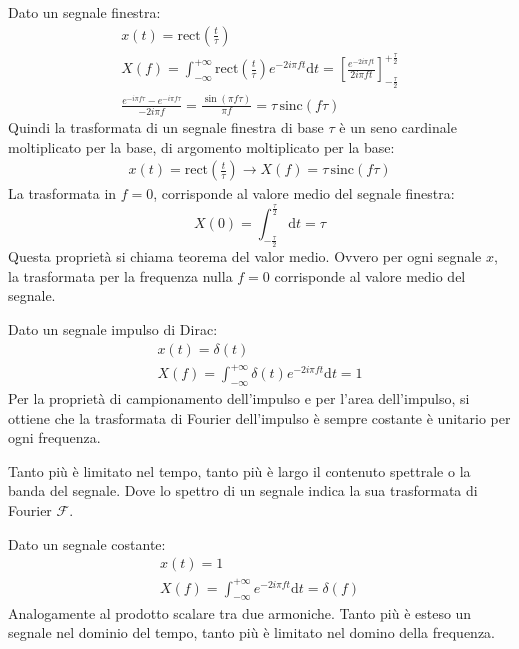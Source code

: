 \documentclass{article}
\newcommand{\rect}{\mathrm{rect}}
\newcommand{\sinc}{\mathrm{sinc}}
\newcommand{\df}{\mathrm{d}}
\numberwithin{equation}{subsection}
\begin{document}
Dato un segnale finestra:
\begin{gather*}
    x(t)=\rect\displaystyle\left(\frac{t}{\tau}\right)\\
    X(f)=\displaystyle\int_{-\infty}^{+\infty}\rect\left(\frac{t}{\tau}\right)e^{-2i\pi ft}\df t=\left[\frac{e^{-2i\pi ft}}{2i\pi ft}\right]^{+\frac{\tau}{2}}_{-\frac{\tau}{2}}\\
    \displaystyle\frac{e^{-i\pi f\tau}-e^{-i\pi f\tau}}{-2i\pi f}=\frac{\sin(\pi f\tau)}{\pi f}=\tau\,\sinc(f\tau)
\end{gather*}
Quindi la trasformata di un segnale finestra di base $\tau$ è un seno cardinale moltiplicato per la base, di argomento moltiplicato per la base:
\begin{gather*}
    x(t)=\rect\displaystyle\left(\frac{t}{\tau}\right)\rightarrow X(f)=\tau\,\sinc(f\tau)
\end{gather*}
La trasformata in $f=0$, corrisponde al valore medio del segnale finestra:
\begin{equation*}
    X(0)=\displaystyle\int_{-\frac{\tau}{2}}^{\frac{\tau}{2}}\df t=\tau
\end{equation*}
Questa proprietà si chiama teorema del valor medio. Ovvero per ogni segnale $x$, la trasformata per la frequenza nulla $f=0$ corrisponde al valore medio del segnale. 



Dato un segnale impulso di Dirac:
\begin{gather*}
    x(t)=\delta(t)\\
    X(f)=\displaystyle\int_{-\infty}^{+\infty}\delta(t)e^{-2i\pi ft}\df t=1
\end{gather*}
Per la proprietà di campionamento dell'impulso e per l'area dell'impulso, si ottiene che la trasformata di Fourier dell'impulso è sempre costante è unitario per ogni frequenza. 


Tanto più è limitato nel tempo, tanto più è largo il contenuto spettrale o la banda del segnale. Dove lo spettro di un segnale indica la sua trasformata di Fourier 
$\mathscr{F}$. 


Dato un segnale costante:
\begin{gather*}
    x(t)=1\\
    X(f)=\displaystyle\int_{-\infty}^{+\infty}e^{-2i\pi ft}\df t=\delta (f)
\end{gather*}
Analogamente al prodotto scalare tra due armoniche. 
Tanto più è esteso un segnale nel dominio del tempo, tanto più è limitato nel domino della frequenza. 
\end{document}
